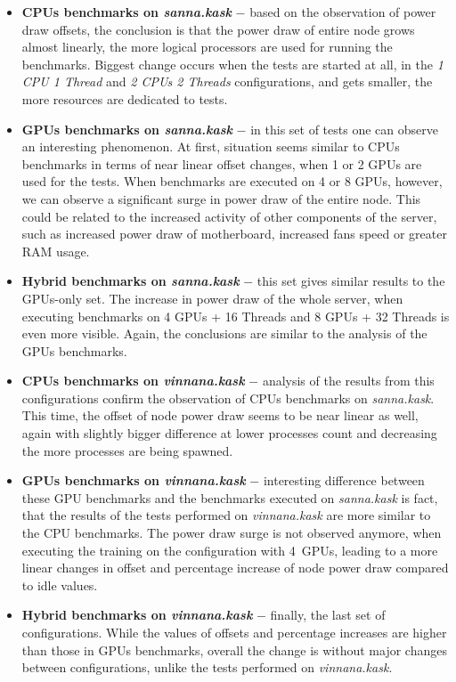 \begin{itemize}
    \item \textbf{CPUs benchmarks on \emph{sanna.kask}} $-$ based on the
    observation of power draw offsets, the conclusion is that the power draw
    of entire node grows almost linearly, the more logical processors are used
    for running the benchmarks. Biggest change occurs when the tests are
    started at all, in the \emph{1 CPU 1 Thread} and \emph{2 CPUs 2 Threads}
    configurations, and gets smaller, the more resources are dedicated to
    tests.
    \item \textbf{GPUs benchmarks on \emph{sanna.kask}} $-$ in this set
    of tests one can observe an interesting phenomenon. At first, situation
    seems similar to CPUs benchmarks in terms of near linear offset changes,
    when 1 or 2 GPUs are used for the tests. When benchmarks are executed on
    4 or 8 GPUs, however, we can observe a significant surge in power draw of
    the entire node. This could be related to the increased activity of other
    components of the server, such as increased power draw of motherboard,
    increased fans speed or greater RAM usage.
    \item \textbf{Hybrid benchmarks on \emph{sanna.kask}} $-$ this set gives
    similar results to the GPUs-only set. The increase in power draw of the
    whole server, when executing benchmarks
    on 4 GPUs + 16 Threads and 8 GPUs + 32 Threads is even more visible.
    Again, the conclusions are similar to the analysis of the GPUs benchmarks.
    \item \textbf{CPUs benchmarks on \emph{vinnana.kask}} $-$ analysis of the
    results from this configurations confirm the observation of CPUs benchmarks
    on \emph{sanna.kask}. This time, the offset of node power draw seems to be
    near linear as well, again with slightly bigger difference at lower
    processes count and decreasing the more processes are being spawned.
    \item \textbf{GPUs benchmarks on \emph{vinnana.kask}} $-$ interesting
    difference between these GPU benchmarks and the benchmarks executed on
    \emph{sanna.kask} is fact, that the results of the tests performed
    on \emph{vinnana.kask} are more similar to the CPU benchmarks. The power
    draw surge is not observed anymore, when executing the training on the
    configuration with 4~GPUs, leading to a more linear changes in offset and
    percentage increase of node power draw compared to idle values.
    \item \textbf{Hybrid benchmarks on \emph{vinnana.kask}} $-$ finally, the
    last set of configurations. While the values of offsets and percentage
    increases are higher than those in GPUs benchmarks, overall the change
    is without major changes between configurations, unlike the tests
    performed on \emph{vinnana.kask}.
\end{itemize}